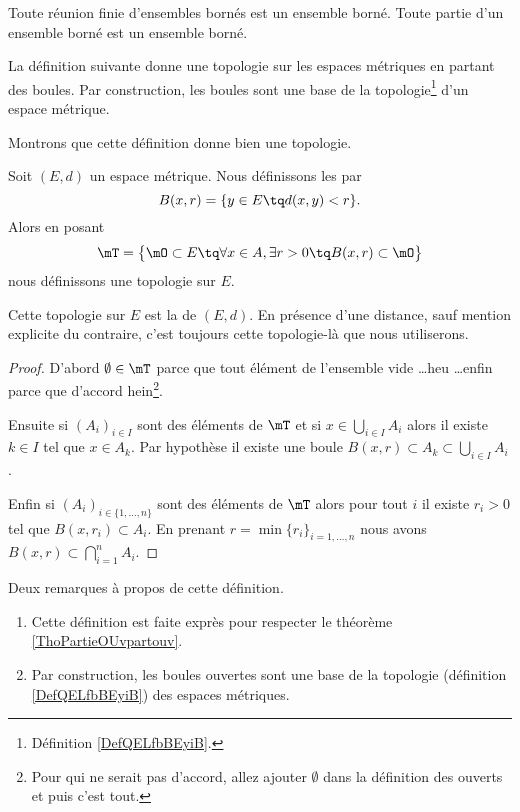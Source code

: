 \begin{proposition}
  Toute réunion finie d'ensembles bornés est un ensemble borné. Toute partie d'un ensemble borné est un ensemble borné.
\end{proposition}

La définition suivante donne une topologie sur les espaces métriques en partant des boules. Par construction, les boules sont une base de la topologie\footnote{Définition \ref{DefQELfbBEyiB}.} d'un espace métrique.

Montrons que cette définition donne bien une topologie.
\begin{theoremDef}     \label{ThoORdLYUu}
    Soit \( (E,d)\) un espace métrique. Nous définissons les  par
    \begin{equation}
        B(x,r)=\{ y\in E\tq d(x,y)<r \}.
    \end{equation}
    Alors en posant
    \begin{equation}        \label{EqGDVVooDZfwSf}
        \mT=\big\{  \mO\subset E  \tq\forall x\in A,\exists r>0\tq B(x,r)\subset \mO \big\}
    \end{equation}
    nous définissons une topologie sur \( E\).

    Cette topologie sur \( E\) est la  de \( (E,d)\). En présence d'une distance, sauf mention explicite du contraire, c'est toujours cette topologie-là que nous utiliserons.
\end{theoremDef}

\begin{proof}
    D'abord \( \emptyset\in\mT\) parce que tout élément de l'ensemble vide \ldots heu \ldots enfin parce que d'accord hein\footnote{Pour qui ne serait pas d'accord, allez ajouter \( \emptyset\) dans la définition des ouverts et puis c'est tout.}.

    Ensuite si \( (A_i)_{i\in I}\) sont des éléments de \( \mT\) et si \( x\in\bigcup_{i\in I}A_i\) alors il existe \( k\in I\) tel que \( x\in A_k\). Par hypothèse il existe une boule \( B(x,r)\subset A_k\subset\bigcup_{i\in I}A_i\).

    Enfin si \( (A_i)_{i\in\{ 1,\ldots, n \}}\) sont des éléments de \( \mT\) alors pour tout \( i\) il existe \( r_i>0\) tel que \( B(x,r_i)\subset A_i\). En prenant \( r=\min\{ r_i \}_{i=1,\ldots, n}\) nous avons $B(x,r)\subset\bigcap_{i=1}^nA_i.$
\end{proof}

\begin{remark}  \label{RemQDRooKnwKk}
    Deux remarques à propos de cette définition.
    \begin{enumerate}
        \item
    Cette définition est faite exprès pour respecter le théorème \ref{ThoPartieOUvpartouv}.
\item
    Par construction, les boules ouvertes sont une base de la topologie (définition \ref{DefQELfbBEyiB}) des espaces métriques.
    \end{enumerate}
\end{remark}

